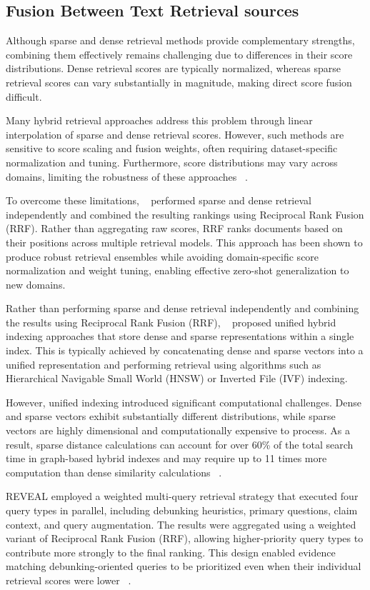 \subsection{Fusion Between Text Retrieval sources}
Although sparse and dense retrieval methods provide complementary strengths, combining them effectively remains challenging due to differences in their score distributions. Dense retrieval scores are typically normalized, whereas sparse retrieval scores can vary substantially in magnitude, making direct score fusion difficult.

Many hybrid retrieval approaches address this problem through linear interpolation of sparse and dense retrieval scores. However, such methods are sensitive to score scaling and fusion weights, often requiring dataset-specific normalization and tuning. Furthermore, score distributions may vary across domains, limiting the robustness of these approaches ~\cite{Wang2021Jul}.

To overcome these limitations, ~\citet{Chen2022Jan} performed sparse and dense retrieval independently and combined the resulting rankings using Reciprocal Rank Fusion (RRF). Rather than aggregating raw scores, RRF ranks documents based on their positions across multiple retrieval models. This approach has been shown to produce robust retrieval ensembles while avoiding domain-specific score normalization and weight tuning, enabling effective zero-shot generalization to new domains.

Rather than performing sparse and dense retrieval independently and combining the results using Reciprocal Rank Fusion (RRF), ~\citet{Zhang2024Oct} proposed unified hybrid indexing approaches that store dense and sparse representations within a single index. This is typically achieved by concatenating dense and sparse vectors into a unified representation and performing retrieval using algorithms such as Hierarchical Navigable Small World (HNSW) or Inverted File (IVF) indexing.

However, unified indexing introduced significant computational challenges. Dense and sparse vectors exhibit substantially different distributions, while sparse vectors are highly dimensional and computationally expensive to process. As a result, sparse distance calculations can account for over 60\% of the total search time in graph-based hybrid indexes and may require up to 11 times more computation than dense similarity calculations ~\cite{Zhang2024Oct}.

REVEAL employed a weighted multi-query retrieval strategy that executed four query types in parallel, including debunking heuristics, primary questions, claim context, and query augmentation. The results were aggregated using a weighted variant of Reciprocal Rank Fusion (RRF), allowing higher-priority query types to contribute more strongly to the final ranking. This design enabled evidence matching debunking-oriented queries to be prioritized even when their individual retrieval scores were lower ~\cite{Tariq2026Mar}.

